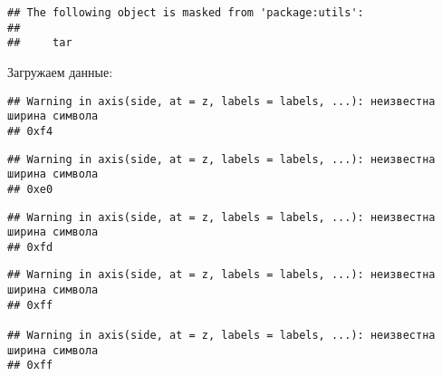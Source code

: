 \documentclass[
]{article}
\newenvironment{Shaded}{\begin{snugshade}}{\end{snugshade}}
\newcommand{\DataTypeTok}[1]{\textcolor[rgb]{0.13,0.29,0.53}{#1}}
\newcommand{\DecValTok}[1]{\textcolor[rgb]{0.00,0.00,0.81}{#1}}
\newcommand{\KeywordTok}[1]{\textcolor[rgb]{0.13,0.29,0.53}{\textbf{#1}}}
\newcommand{\NormalTok}[1]{#1}
\newcommand{\OtherTok}[1]{\textcolor[rgb]{0.56,0.35,0.01}{#1}}
\newcommand{\StringTok}[1]{\textcolor[rgb]{0.31,0.60,0.02}{#1}}
\begin{document}
\begin{verbatim}
## The following object is masked from 'package:utils':
## 
##     tar
\end{verbatim}

Загружаем данные:

\begin{Shaded}
\end{Shaded}

\begin{verbatim}
## Warning in axis(side, at = z, labels = labels, ...): неизвестна ширина символа
## 0xf4
\end{verbatim}

\begin{verbatim}
## Warning in axis(side, at = z, labels = labels, ...): неизвестна ширина символа
## 0xe0
\end{verbatim}

\begin{verbatim}
## Warning in axis(side, at = z, labels = labels, ...): неизвестна ширина символа
## 0xfd
\end{verbatim}

\begin{verbatim}
## Warning in axis(side, at = z, labels = labels, ...): неизвестна ширина символа
## 0xff

## Warning in axis(side, at = z, labels = labels, ...): неизвестна ширина символа
## 0xff
\end{verbatim}
\end{document}

